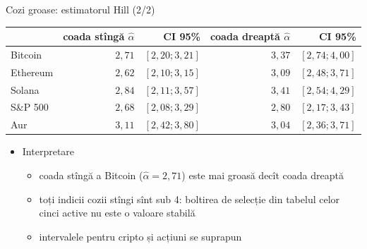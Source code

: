 \begin{frame}{Cozi groase: estimatorul Hill (2/2)}
\itemsize{\footnotesize}
\begin{center}
\scriptsize
\begin{tabular}{lrrrr}
\toprule
& coada stîngă $\hat\alpha$ & CI 95\% & coada dreaptă $\hat\alpha$ & CI 95\% \\
\midrule
Bitcoin & $2{,}71$ & $[2{,}20; 3{,}21]$ & $3{,}37$ & $[2{,}74; 4{,}00]$ \\
Ethereum & $2{,}62$ & $[2{,}10; 3{,}15]$ & $3{,}09$ & $[2{,}48; 3{,}71]$ \\
Solana & $2{,}84$ & $[2{,}11; 3{,}57]$ & $3{,}41$ & $[2{,}54; 4{,}29]$ \\
S\&P 500 & $2{,}68$ & $[2{,}08; 3{,}29]$ & $2{,}80$ & $[2{,}17; 3{,}43]$ \\
Aur & $3{,}11$ & $[2{,}42; 3{,}80]$ & $3{,}04$ & $[2{,}36; 3{,}71]$ \\
\bottomrule
\end{tabular}
\end{center}
\begin{itemize}
    \item Interpretare
    \begin{itemize}
        \item coada stîngă a Bitcoin ($\hat\alpha = 2{,}71$) este mai groasă decît coada dreaptă
        \item toți indicii cozii stîngi sînt sub 4: boltirea de selecție din tabelul celor cinci active nu este o valoare stabilă
        \item intervalele pentru cripto și acțiuni se suprapun
    \end{itemize}
\end{itemize}
\end{frame}

